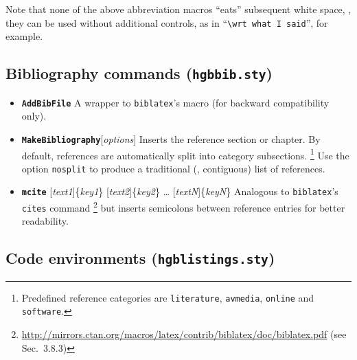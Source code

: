 \documentclass[language=english]{hgbarticle}
\begin{document}
\noindent
Note that none of the above abbreviation macros ``eats'' subsequent white
space, \ie, they can be used without additional controls, as in
``\verb!\wrt what I said!'', for example.

\subsection{Bibliography commands (\texttt{hgbbib.sty})}

\begin{itemize}
    \item 
    \textbf{\texttt{{\bs}AddBibFile}}\newline
    A wrapper to \texttt{biblatex}'s \verb!! macro (for backward compatibility only).
    \item
    \textbf{\texttt{{\bs}MakeBibliography}}[\emph{options}]
    \newline
    Inserts the
    reference section or chapter. By default, references are automatically
    split into category subsections.%
    \footnote{Predefined reference categories are \texttt{literature},
        \texttt{avmedia}, \texttt{online} and \texttt{software}.}
    Use the option \texttt{nosplit} to produce a traditional (\ie,
    contiguous) list of references.
    \item
    \textbf{\texttt{{\bs}mcite}}%
        [\emph{text1}]\{\emph{key1}\}%
        [\emph{text2}]\{\emph{key2}\}%
        \ldots
        [\emph{textN}]\{\emph{keyN}\}%
    \newline
    Analogous to \texttt{bib\-la\-tex}'s \texttt{{\bs}cites} command%
    \footnote{%
    \url{http://mirrors.ctan.org/macros/latex/contrib/biblatex/doc/biblatex.pdf}
    (see Sec.~3.8.3)} but inserts semicolons between reference entries for
    better readability.
\end{itemize}



\subsection{Code environments (\texttt{hgblistings.sty})}
\end{document}

